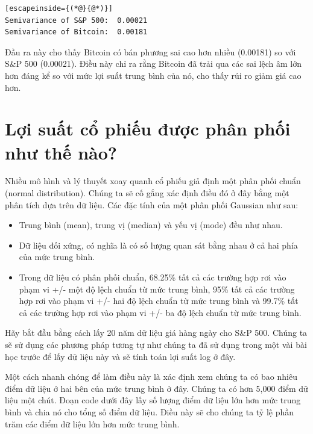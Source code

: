 \begin{lstlisting}[escapeinside={(*@}{@*)}]
Semivariance of S&P 500:  0.00021
Semivariance of Bitcoin:  0.00181
\end{lstlisting}

Đầu ra này cho thấy Bitcoin có bán phương sai cao hơn nhiều (0.00181) so với S\&P 500 (0.00021). Điều này chỉ ra rằng Bitcoin đã trải qua các sai lệch âm lớn hơn đáng kể so với mức lợi suất trung bình của nó, cho thấy rủi ro giảm giá cao hơn.

\section{Lợi suất cổ phiếu được phân phối như thế nào?}

Nhiều mô hình và lý thuyết xoay quanh cổ phiếu giả định một phân phối chuẩn (normal distribution). Chúng ta sẽ cố gắng xác định điều đó ở đây bằng một phân tích dựa trên dữ liệu. Các đặc tính của một phân phối Gaussian như sau:

\begin{itemize}
  \item Trung bình (mean), trung vị (median) và yếu vị (mode) đều như nhau.
  \item Dữ liệu đối xứng, có nghĩa là có số lượng quan sát bằng nhau ở cả hai phía của mức trung bình.
  \item Trong dữ liệu có phân phối chuẩn, 68.25\% tất cả các trường hợp rơi vào phạm vi +/- một độ lệch chuẩn từ mức trung bình, 95\% tất cả các trường hợp rơi vào phạm vi +/- hai độ lệch chuẩn từ mức trung bình và 99.7\% tất cả các trường hợp rơi vào phạm vi +/- ba độ lệch chuẩn từ mức trung bình.
\end{itemize}
Hãy bắt đầu bằng cách lấy 20 năm dữ liệu giá hàng ngày cho S\&P 500. Chúng ta sẽ sử dụng các phương pháp tương tự như chúng ta đã sử dụng trong một vài bài học trước để lấy dữ liệu này và sẽ tính toán lợi suất log ở đây.

Một cách nhanh chóng để làm điều này là xác định xem chúng ta có bao nhiêu điểm dữ liệu ở hai bên của mức trung bình ở đây. Chúng ta có hơn 5,000 điểm dữ liệu một chút. Đoạn code dưới đây lấy số lượng điểm dữ liệu lớn hơn mức trung bình và chia nó cho tổng số điểm dữ liệu. Điều này sẽ cho chúng ta tỷ lệ phần trăm các điểm dữ liệu lớn hơn mức trung bình.

